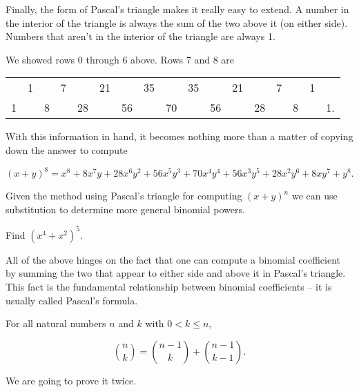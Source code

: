 Finally, the form of Pascal's triangle makes it really easy to extend.  
A number in the interior of the triangle is always the sum of the two
above it (on either side).  Numbers that aren't in the interior of the
triangle are always 1.


We showed rows 0 through 6 above.  Rows 7 and 8 are

\begin{center}
\begin{tabular}{ccccccccccccccccc}
   & 1 &   & 7 &    & 21 &    & 35 &    & 35 &    & 21 &    & 7 &   & 1 & \\
 1 &   & 8 &   & 28 &    & 56 &    & 70 &    & 56 &    & 28 &   & 8 &   & 1. \\ \end{tabular}
\end{center}

With this information in hand, it becomes nothing more than a matter of copying
down the answer to compute

\[ (x+y)^8 =  x^8 + 8x^7y + 28x^6y^2 + 56x^5y^3 + 70x^4y^4 + 56x^3y^5 + 28x^2y^6 + 8xy^7 + y^8. \]

\begin{exer} 
Given the method using Pascal's triangle for computing $(x+y)^n$ we can
use substitution to determine more general binomial powers.

Find $(x^4 + x^2)^5$.
\end{exer}

All of the above hinges on the fact that one can compute a binomial
coefficient by summing the two that appear to either side and above it
in Pascal's triangle.  This fact is the fundamental relationship
between binomial coefficients -- it is usually called Pascal's formula.

\begin{thm}
For all natural numbers $n$ and $k$ with $0 < k \leq n$,

\[ \binom{n}{k} = \binom{n-1}{k} + \binom{n-1}{k-1}. \]
\end{thm}

We are going to prove it twice.

